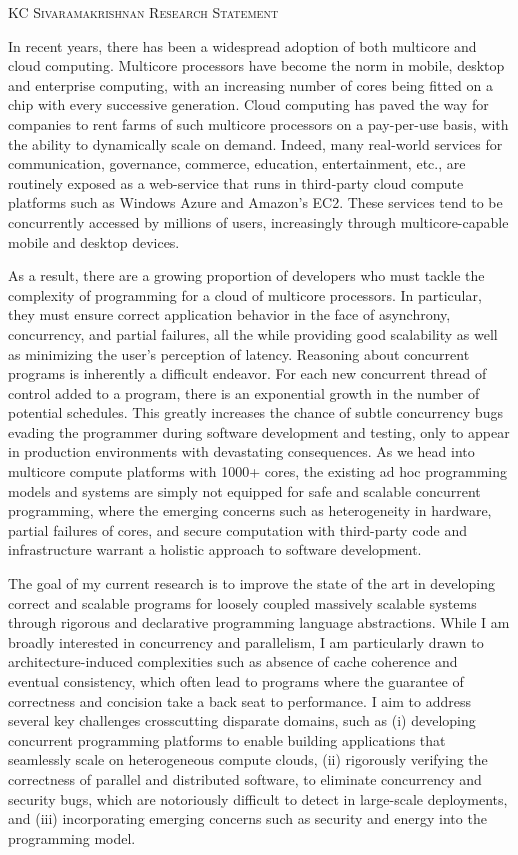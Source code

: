 \documentclass{article}
\begin{document}
\noindent \Large \textsc{KC Sivaramakrishnan} \hfill \textsc{Research Statement} \normalsize

\noindent \hrulefill

In recent years, there has been a widespread adoption of both multicore and
cloud computing. Multicore processors have become the norm in mobile, desktop
and enterprise computing, with an increasing number of cores being fitted on a
chip with every successive generation. Cloud computing has paved the way for
companies to rent farms of such multicore processors on a pay-per-use basis,
with the ability to dynamically scale on demand. Indeed, many real-world
services for communication, governance, commerce, education, entertainment,
etc., are routinely exposed as a web-service that runs in third-party cloud
compute platforms such as Windows Azure and Amazon's EC2. These services tend
to be concurrently accessed by millions of users, increasingly through
multicore-capable mobile and desktop devices.

As a result, there are a growing proportion of developers who must tackle the
complexity of programming for a cloud of multicore processors. In particular,
they must ensure correct application behavior in the face of asynchrony,
concurrency, and partial failures, all the while providing good scalability as
well as minimizing the user's perception of latency. Reasoning about concurrent
programs is inherently a difficult endeavor. For each new concurrent thread of
control added to a program, there is an exponential growth in the number of
potential schedules. This greatly increases the chance of subtle concurrency
bugs evading the programmer during software development and testing, only to
appear in production environments with devastating consequences. As we head
into multicore compute platforms with 1000+ cores, the existing ad hoc
programming models and systems are simply not equipped for safe and scalable
concurrent programming, where the emerging concerns such as heterogeneity in
hardware, partial failures of cores, and secure computation with third-party
code and infrastructure warrant a holistic approach to software development.

The goal of my current research is to improve the state of the art in
developing correct and scalable programs for loosely coupled massively scalable
systems through rigorous and declarative programming language abstractions.
While I am broadly interested in concurrency and parallelism, I am particularly
drawn to architecture-induced complexities such as absence of cache coherence
and eventual consistency, which often lead to programs where the guarantee of
correctness and concision take a back seat to performance. I aim to address
several key challenges crosscutting disparate domains, such as (i) developing
concurrent programming platforms to enable building applications that
seamlessly scale on heterogeneous compute clouds, (ii) rigorously verifying the
correctness of parallel and distributed software, to eliminate concurrency and
security bugs, which are notoriously difficult to detect in large-scale
deployments, and (iii) incorporating emerging concerns such as security and
energy into the programming model.
\end{document}
